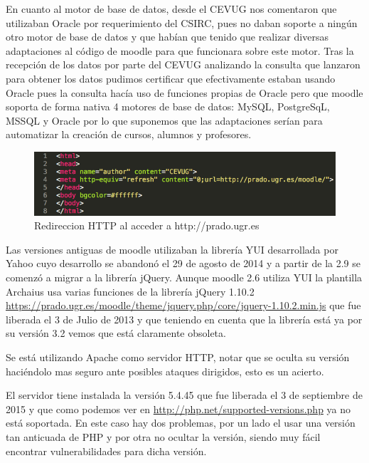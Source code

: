 \bigskip
En cuanto al motor de base de datos, desde el CEVUG nos comentaron que utilizaban Oracle por requerimiento del CSIRC, pues no daban soporte a ningún otro motor de base de datos y que habían que tenido que realizar diversas adaptaciones al código de moodle para que funcionara sobre este motor. Tras la recepción de los datos por parte del CEVUG analizando la consulta que lanzaron para obtener los datos pudimos certificar que efectivamente estaban usando Oracle pues la consulta hacía uso de funciones propias de Oracle pero que moodle soporta de forma nativa 4 motores de base de datos: MySQL, PostgreSqL, MSSQL y Oracle por lo que suponemos que las adaptaciones serían para automatizar la creación de cursos, alumnos y profesores.  


\begin{figure}
\centering
\includegraphics[width=1.0\textwidth]{../screenshots/redireccionhttp}
\caption{Redireccion HTTP al acceder a http://prado.ugr.es}
\label{redireccionhttp}
\end{figure}

\bigskip
Las versiones antiguas de moodle utilizaban la librería YUI desarrollada por Yahoo cuyo desarrollo se abandonó el 29 de agosto de 2014 \cite{art_01} y a partir de la 2.9 se comenzó a migrar a la librería jQuery. Aunque moodle 2.6 utiliza YUI la plantilla Archaius usa varias funciones de la librería jQuery 1.10.2 \url{https://prado.ugr.es/moodle/theme/jquery.php/core/jquery-1.10.2.min.js} que fue liberada el 3 de Julio de 2013 y que teniendo en cuenta que la librería está ya por su versión 3.2 vemos que está claramente obsoleta.

\bigskip
Se está utilizando Apache como servidor HTTP, notar que se oculta su versión haciéndolo mas seguro ante posibles ataques dirigidos, esto es un acierto.

\bigskip
El servidor tiene instalada la versión 5.4.45 que fue liberada el 3 de septiembre de 2015 y que como podemos ver en \url{http://php.net/supported-versions.php} ya no está soportada. En este caso hay dos problemas, por un lado el usar una versión tan anticuada de PHP y por otra no ocultar la versión, siendo muy fácil encontrar vulnerabilidades para dicha versión.

